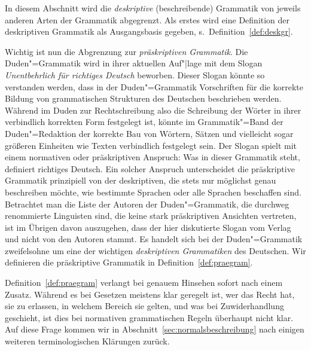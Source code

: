 In diesem Abschnitt wird die \textit{deskriptive} (beschreibende) Grammatik von jeweils anderen Arten der Grammatik abgegrenzt.
Als erstes wird eine Definition der deskriptiven Grammatik als Ausgangsbasis gegeben, s.\ Definition~\ref{def:deskgr}.



Wichtig ist nun die Abgrenzung zur \textit{präskriptiven Grammatik}.
Die Duden"=Grammatik \citep{Duden8} wird in ihrer aktuellen Auf"|lage mit dem Slogan \textit{Unentbehrlich für richtiges Deutsch} beworben.
Dieser Slogan könnte so verstanden werden, dass in der Duden"=Grammatik Vorschriften für die korrekte Bildung von grammatischen Strukturen des Deutschen beschrieben werden.
Während im Duden zur Rechtschreibung also die Schreibung der Wörter in ihrer verbindlich korrekten Form festgelegt ist, könnte im Grammatik"=Band der Duden"=Redaktion der korrekte Bau von Wörtern, Sätzen und vielleicht sogar größeren Einheiten wie Texten verbindlich festgelegt sein.
Der Slogan spielt mit einem normativen oder präskriptiven Anspruch:
Was in dieser Grammatik steht, definiert richtiges Deutsch.
Ein solcher Anspruch unterscheidet die präskriptive Grammatik prinzipiell von der deskriptiven, die stets nur möglichst genau beschreiben möchte, wie bestimmte Sprachen oder alle Sprachen beschaffen sind.
Betrachtet man die Liste der Autoren der Duden"=Grammatik, die durchweg renommierte Linguisten sind, die keine stark präskriptiven Ansichten vertreten, ist im Übrigen davon auszugehen, dass der hier diskutierte Slogan vom Verlag und nicht von den Autoren stammt.
Es handelt sich bei der Duden"=Grammatik zweifelsohne um eine der wichtigen \textit{deskriptiven Grammatiken} des Deutschen.
Wir definieren die präskriptive Grammatik in Definition~\ref{def:praegram}.



Definition~\ref{def:praegram} verlangt bei genauem Hinsehen sofort nach einem Zusatz.
Während es bei Gesetzen meistens klar geregelt ist, wer das Recht hat, sie zu erlassen, in welchem Bereich sie gelten, und was bei Zuwiderhandlung geschieht, ist dies bei normativen grammatischen Regeln überhaupt nicht klar.
Auf diese Frage kommen wir in Abschnitt~\ref{sec:normalsbeschreibung} nach einigen weiteren terminologischen Klärungen zurück.


